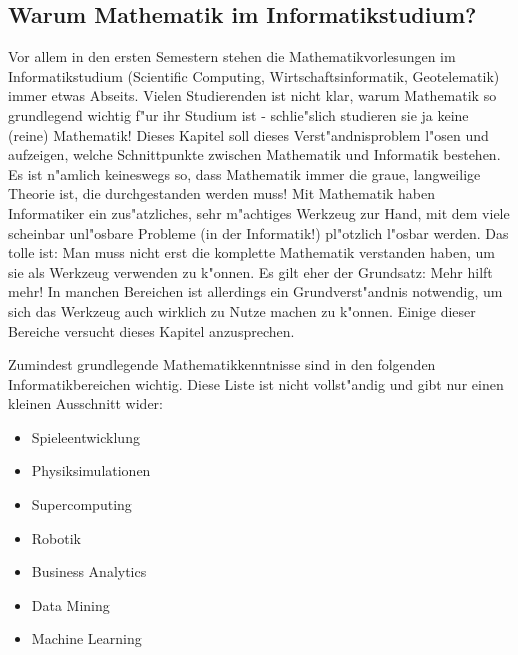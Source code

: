 \subsection{Warum Mathematik im Informatikstudium?}
Vor allem in den ersten Semestern stehen die Mathematikvorlesungen im Informatikstudium (Scientific Computing, Wirtschaftsinformatik, Geotelematik) immer etwas Abseits. Vielen Studierenden ist nicht klar, warum Mathematik so grundlegend wichtig f"ur ihr Studium ist - schlie"slich studieren sie ja keine (reine) Mathematik! Dieses Kapitel soll dieses Verst"andnisproblem l"osen und aufzeigen, welche Schnittpunkte zwischen Mathematik und Informatik bestehen. Es ist n"amlich keineswegs so, dass Mathematik immer die graue, langweilige Theorie ist, die \glqq durchgestanden werden muss\grqq ! Mit Mathematik haben Informatiker ein zus"atzliches, sehr m"achtiges Werkzeug zur Hand, mit dem viele scheinbar unl"osbare Probleme (in der Informatik!) pl"otzlich l"osbar werden. Das tolle ist: Man muss nicht erst die komplette Mathematik verstanden haben, um sie als Werkzeug verwenden zu k"onnen. Es gilt eher der Grundsatz: Mehr hilft mehr! In manchen Bereichen ist allerdings ein Grundverst"andnis notwendig, um sich das Werkzeug auch wirklich zu Nutze machen zu k"onnen. Einige dieser Bereiche versucht dieses Kapitel anzusprechen.

Zumindest grundlegende Mathematikkenntnisse sind in den folgenden Informatikbereichen wichtig. Diese Liste ist nicht vollst"andig und gibt nur einen kleinen Ausschnitt wider:
\begin{itemize}
\item Spieleentwicklung
\item Physiksimulationen
\item Supercomputing
\item Robotik
\item Business Analytics
\item Data Mining
\item Machine Learning
\end{itemize}

